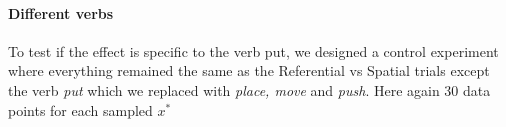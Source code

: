 
\paragraph{Different verbs}  
To test if the effect is specific to the verb put, we designed a control experiment where everything remained the same as the Referential vs Spatial trials except the verb \textit{put} which we replaced with \textit{place, move} and \textit{push}. Here again 30 data points for each sampled $x^*$

